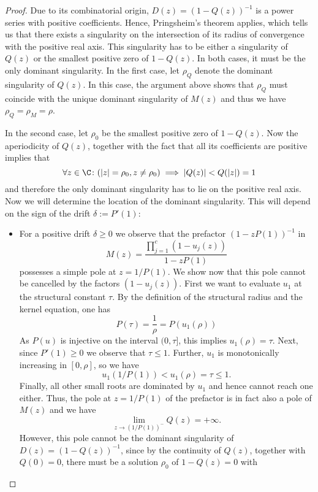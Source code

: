 \begin{proof}
  Due to its combinatorial origin, $D(z) = (1-Q(z))^{-1}$ is a power series with positive coefficients. 
  Hence, Pringsheim's theorem applies, which tells us that there exists a singularity on the intersection of its radius of convergence with the positive real axis. 
  This singularity has to be either a singularity of $Q(z)$ or the smallest positive zero of $1 - Q(z)$. 
  In both cases, it must be the only dominant singularity.
  In the first case, let $\rho_Q$ denote the dominant singularity of $Q(z)$.
  In this case, the argument above shows that $\rho_Q$ must coincide with the unique dominant singularity of $M(z)$ and thus we have $\rho_Q = \rho_M = \rho$.

  In the second case, let $\rho_0$ be the smallest positive zero of $1 - Q(z)$. Now the aperiodicity of $Q(z)$, together with the fact that all its coefficients are positive implies that
  $$
  \forall z \in \C \colon (|z| = \rho_0, z \neq \rho_0) \implies |Q(z)| < Q(|z|) = 1
  $$
  and therefore the only dominant singularity has to lie on the positive real axis.
  Now we will determine the location of the dominant singularity. This will depend on the sign of the drift $\delta := P'(1)$:
  \begin{itemize}
    \item 
      For a positive drift $\delta \geq 0$ we observe that the prefactor $(1-zP(1))^{-1}$ in 
      $$
        M(z) = \frac{\prod_{j=1}^c (1 - u_j(z))}{1 - zP(1)}
      $$ 
      possesses a simple pole at $z = 1/P(1)$. We show now that this pole cannot be cancelled by the factors $(1 - u_j(z))$. First we want to evaluate $u_1$ at the structural constant $\tau$. By the definition of the structural radius and the kernel equation, one has
      $$
        P(\tau) = \frac{1}{\rho} = P(u_1(\rho))
      $$
      As $P(u)$ is injective on the interval $(0,\tau]$, this implies $u_1(\rho) = \tau$. Next, since $P'(1) \geq 0$ we observe that $\tau \leq 1$. Further, $u_1$ is monotonically increasing in $[0,\rho]$, so we have 
      $$
        u_1\left(1/P(1)\right) < u_1(\rho) = \tau \leq 1.
      $$
      Finally, all other small roots are dominated by $u_1$ and hence cannot reach one either.
      Thus, the pole at $z = 1/P(1)$ of the prefactor is in fact also a pole of $M(z)$ and we have 
      $$
        \lim_{z \to (1/P(1))^-}Q(z) = +\infty.
      $$
      However, this pole cannot be the dominant singularity of $D(z) = (1 - Q(z))^{-1}$, since by the continuity of $Q(z)$, together with $Q(0) = 0$, there must be a solution $\rho_0$ of $1 - Q(z) = 0$ with

\end{itemize}
\end{proof}
